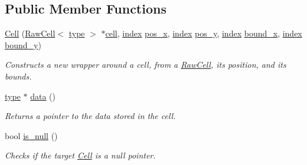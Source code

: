 \subsection*{Public Member Functions}
\begin{DoxyCompactItemize}
\item 
\hyperlink{classmaze_1_1Cell_af62f7d677daf7ccd54313843dd2297b1}{Cell} (\hyperlink{classmaze_1_1RawCell}{Raw\+Cell}$<$ \hyperlink{classmaze_1_1Cell_a33cfcdd0d72cc870c85e62852faaf530}{type} $>$ $\ast$\hyperlink{classmaze_1_1Cell_abc349a9368caf134c164e3c79f71881d}{cell}, \hyperlink{namespacemaze_ae8120a098fabafbbfa264a3c619640b3}{index} \hyperlink{classmaze_1_1Cell_acb30c995ef7274e0641f7ec3fbb4f81d}{pos\+\_\+x}, \hyperlink{namespacemaze_ae8120a098fabafbbfa264a3c619640b3}{index} \hyperlink{classmaze_1_1Cell_ae9c8a0cedd27a418ebf6ae53e8ad3e7c}{pos\+\_\+y}, \hyperlink{namespacemaze_ae8120a098fabafbbfa264a3c619640b3}{index} \hyperlink{classmaze_1_1Cell_a84373a5689d96f09edafb242d29ab305}{bound\+\_\+x}, \hyperlink{namespacemaze_ae8120a098fabafbbfa264a3c619640b3}{index} \hyperlink{classmaze_1_1Cell_a59f029039ae6e046d36966ff52109b46}{bound\+\_\+y})
\begin{DoxyCompactList}\small\item\em Constructs a new wrapper around a cell, from a \hyperlink{classmaze_1_1RawCell}{Raw\+Cell}, its position, and its bounds. \end{DoxyCompactList}\item 
\mbox{\label{classmaze_1_1Cell_ae4932173d3ff8937edd5915600a43226}} 
\hyperlink{classmaze_1_1Cell_a33cfcdd0d72cc870c85e62852faaf530}{type} $\ast$ \hyperlink{classmaze_1_1Cell_ae4932173d3ff8937edd5915600a43226}{data} ()
\begin{DoxyCompactList}\small\item\em Returns a pointer to the data stored in the cell. \end{DoxyCompactList}\item 
\mbox{\label{classmaze_1_1Cell_ad3f0f0bc988195f1b6e21700bb973598}} 
bool \hyperlink{classmaze_1_1Cell_ad3f0f0bc988195f1b6e21700bb973598}{is\+\_\+null} ()
\begin{DoxyCompactList}\small\item\em Checks if the target \hyperlink{classmaze_1_1Cell}{Cell} is a null pointer. \end{DoxyCompactList}\item 
\mbox{\label{classmaze_1_1Cell_a6893b4512b070791eed9d4b122b89c5a}} 

\end{DoxyCompactItemize}
